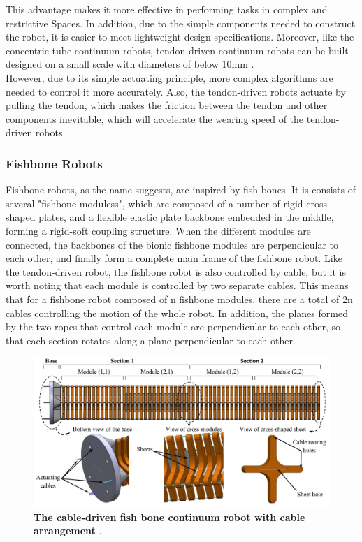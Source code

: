 This advantage makes it more effective in performing tasks in complex and restrictive Spaces. In addition, due to the simple 
components needed to construct the robot, it is easier to meet lightweight design specifications. Moreover, like the 
concentric-tube continuum robots, tendon-driven continuum robots can be built designed on a small scale with diameters of 
below 10mm \cite{amanov2021tendon}. \\
However, due to its simple actuating principle, more complex algorithms are needed to control it more accurately. Also, the 
tendon-driven robots actuate by pulling the tendon, which makes the friction between the tendon and other components inevitable, 
which will accelerate the wearing speed of the tendon-driven robots.
\subsubsection{Fishbone Robots}
Fishbone robots, as the name suggests, are inspired by fish bones. It is consists of several "fishbone moduless", which are 
composed of a number of rigid cross-shaped plates, and a flexible elastic plate backbone embedded in the middle, 
forming a rigid-soft coupling structure\cite{fishboneCR}. When the different modules are connected, the backbones of the bionic fishbone modules 
are perpendicular to each other, and finally form a complete main frame of the fishbone robot. Like the tendon-driven robot, 
the fishbone robot is also controlled by cable, but it is worth noting that each module is controlled by two separate 
cables. This means that for a fishbone robot composed of n fishbone modules, there are a total of 2n cables controlling the motion
of the whole robot. In addition, the planes formed by the two ropes that control each module are perpendicular to each other, so 
that each section rotates along a plane perpendicular to each other. 
\begin{figure}[H] %
    \centering %
    \captionsetup{labelsep=colon}
    \includegraphics[width=.9\textwidth]{Image/LR/fishbone_CR_amouri2023bio.PNG} 
    \caption[The cable-driven fish bone continuum robot]
    {\centering \textbf{The cable-driven fish bone continuum robot with cable arrangement} \cite{amouri2023bio}.}
    \label{fig:fishboneCR_2023bio}
\end{figure}
